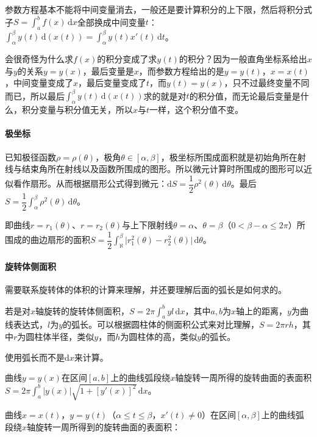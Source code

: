 \documentclass[UTF8, 12pt]{ctexart}
\begin{document}
参数方程基本不能将中间变量消去，一般还是要计算积分的上下限，然后将积分式子$S=\int_a^bf(x)\,\textrm{d}x$全部换成中间变量$t$：$\int_\alpha^\beta y(t)\,\textrm{d}(x(t))=\int_\alpha^\beta y(t)x'(t)\,\textrm{d}t$。

会很奇怪为什么求$f(x)$的积分变成了求$y(t)$的积分？因为一般直角坐标系给出$x$与$y$的关系$y=y(x)$，最后变量是$x$，而参数方程给出的是$y=y(t)$，$x=x(t)$，中间变量变成了$x$，最后变量变成了$t$，而$y(t)=y(x)$，只不过最终变量不同而已，所以最后$\int_\alpha^\beta y(t)\,\textrm{d}(x(t))$求的就是对$t$的积分值，而无论最后变量是什么，积分变量与积分值无关，所以$x$与$t$一样，这个积分值不变。

\paragraph{极坐标} \leavevmode \medskip

已知极径函数$\rho=\rho(\theta)$，极角$\theta\in[\alpha,\beta]$，极坐标所围成面积就是初始角所在射线与结束角所在射线以及函数所围成的图形。所以微元计算时所围成的图形可以近似看作扇形。从而根据扇形公式得到微元：$\textrm{d}S=\dfrac{1}{2}\rho^2(\theta)\,\textrm{d}\theta$。最后$S=\dfrac{1}{2}\int_\alpha^\beta\rho^2(\theta)\,\textrm{d}\theta$。

即曲线$r=r_1(\theta)$、$r=r_2(\theta)$与上下限射线$\theta=\alpha$、$\theta=\beta$（$0<\beta-\alpha\leqslant2\pi$）所围成的曲边扇形的面积$S=\dfrac{1}{2}\int_\aleph^\beta\vert r_1^2(\theta)-r_2^2(\theta)\vert\,\textrm{d}\theta$。

\paragraph{旋转体侧面积} \leavevmode \medskip

需要联系旋转体的体积的计算来理解，并还要理解后面的弧长是如何求的。

若是对$x$轴旋转的旋转体侧面积，$S=2\pi\int_a^byl\,\textrm{d}x$，其中$a,b$为$x$轴上的距离，$y$为曲线表达式，$l$为$y$的弧长。可以根据圆柱体的侧面积公式来对比理解，$S=2\pi rh$，其中$r$为圆柱体半径，类似$y$，而$h$为圆柱体的高，类似$y$的弧长。

使用弧长而不是$\textrm{d}x$来计算。

曲线$y=y(x)$在区间$[a,b]$上的曲线弧段绕$x$轴旋转一周所得的旋转曲面的表面积$S=2\pi\int_a^b\vert y(x)\vert\sqrt{1+[y'(x)]^2}\,\textrm{d}x$。

曲线$x=x(t)$，$y=y(t)$（$\alpha\leqslant t\leqslant\beta$，$x'(t)\neq0$）在区间$[\alpha,\beta]$上的曲线弧段绕$x$轴旋转一周所得到的旋转曲面的表面积：
\end{document}
